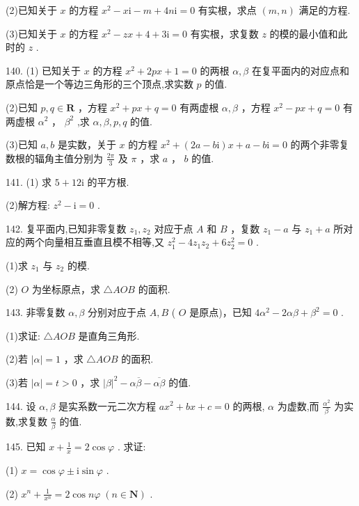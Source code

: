 \documentclass[10pt]{article}
\begin{document}
(2)已知关于 \(x\) 的方程 \({x}^{2} - x\mathrm{i} - m + {4n}\mathrm{i} = 0\) 有实根，求点 \(\left( {m,n}\right)\) 满足的方程.

(3)已知关于 \(x\) 的方程 \({x}^{2} - {zx} + 4 + 3\mathrm{i} = 0\) 有实根，求复数 \(z\) 的模的最小值和此时的 \(z\) .

140. (1) 已知关于 \(x\) 的方程 \({x}^{2} + {2px} + 1 = 0\) 的两根 \(\alpha ,\beta\) 在复平面内的对应点和原点恰是一个等边三角形的三个顶点,求实数 \(p\) 的值.

(2)已知 \(p,q \in  \mathbf{R}\) ，方程 \({x}^{2} + {px} + q = 0\) 有两虚根 \(\alpha ,\beta\) ，方程 \({x}^{2} - {px} + q = 0\) 有两虚根 \({\alpha }^{2}\) ， \({\beta }^{2}\) ,求 \(\alpha ,\beta ,p,q\) 的值.

(3)已知 \(a,b\) 是实数，关于 \(x\) 的方程 \({x}^{2} + \left( {{2a} - {b\mathrm{i}}}\right) x + a - {b\mathrm{i}} = 0\) 的两个非零复数根的辐角主值分别为 \(\frac{2\pi }{3}\) 及 \(\pi\) ，求 \(a\) ， \(b\) 的值.

141. (1) 求 \(5 + {12}\mathrm{i}\) 的平方根.

(2)解方程: \({z}^{2} - \mathrm{i} = 0\) .

142. 复平面内,已知非零复数 \({z}_{1},{z}_{2}\) 对应于点 \(A\) 和 \(B\) ，复数 \({z}_{1} - a\) 与 \({z}_{1} + a\) 所对应的两个向量相互垂直且模不相等,又 \({z}_{1}^{2} - 4{z}_{1}{z}_{2} + 6{z}_{2}^{2} = 0\) .

(1)求 \({z}_{1}\) 与 \({z}_{2}\) 的模.

(2) \(O\) 为坐标原点，求 \(\bigtriangleup  {AOB}\) 的面积.

143. 非零复数 \(\alpha ,\beta\) 分别对应于点 \(A,B\) ( \(O\) 是原点)，已知 \(4{\alpha }^{2} - {2\alpha \beta } + {\beta }^{2} = 0\) .

(1)求证: \(\bigtriangleup  {AOB}\) 是直角三角形.

(2)若 \(\left| \alpha \right|  = 1\) ，求 \(\bigtriangleup  {AOB}\) 的面积.

(3)若 \(\left| \alpha \right|  = t > 0\) ，求 \({\left| \beta \right| }^{2} - \alpha \overline{\beta } - \overline{\alpha \beta }\) 的值.

144. 设 \(\alpha ,\beta\) 是实系数一元二次方程 \(a{x}^{2} + {bx} + c = 0\) 的两根, \(\alpha\) 为虚数,而 \(\frac{{\alpha }^{2}}{\beta }\) 为实数,求复数 \(\frac{\alpha }{\beta }\) 的值.

145. 已知 \(x + \frac{1}{x} = 2\cos \varphi\) . 求证:

(1) \(x = \cos \varphi  \pm  \mathrm{i}\sin \varphi\) .

(2) \({x}^{n} + \frac{1}{{x}^{n}} = 2\cos {n\varphi }\;\left( {n \in  \mathbf{N}}\right)\) .
\end{document}
